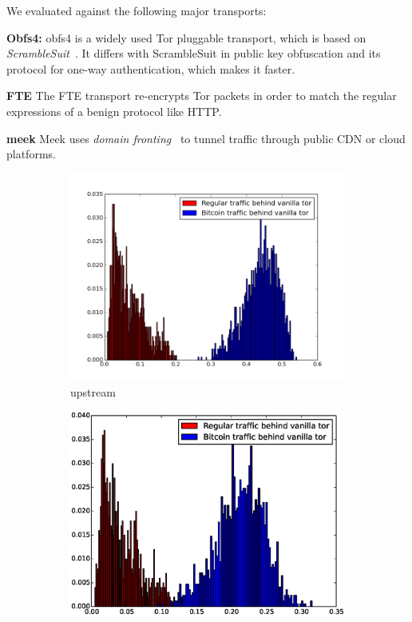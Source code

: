  We evaluated against the following major transports:
\begin{compactitem}
\item	\textbf{Obfs4:}
obfs4 is a widely used Tor pluggable transport, which is based on \textit{ScrambleSuit}~\cite{scramblesuit}. It differs with ScrambleSuit in public key obfuscation and its protocol for one-way authentication, which makes it faster. 
\item \textbf{FTE} 
The FTE transport re-encrypts Tor packets in order to match the regular expressions of a benign protocol like HTTP. 
\item\textbf{meek}
Meek uses \textit{domain fronting}~\cite{meek-PETS} to tunnel traffic through public CDN or cloud platforms. 
\end{compactitem}
\begin{figure}
\centering
\begin{subfigure}{0.48\linewidth}
\centering
\includegraphics[width=\linewidth]{image/ratio_609_upstream_compact_vanilla_tor.png}
\caption{upstream}
\label{fig:ratio_609_upstream_compact_vanilla_tor}
\end{subfigure}
\begin{subfigure}{0.48\linewidth}
\centering
\includegraphics[width=\linewidth]{image/ratio_609_downstream_compact_vanilla_tor.eps}

\end{subfigure}
\end{figure}
